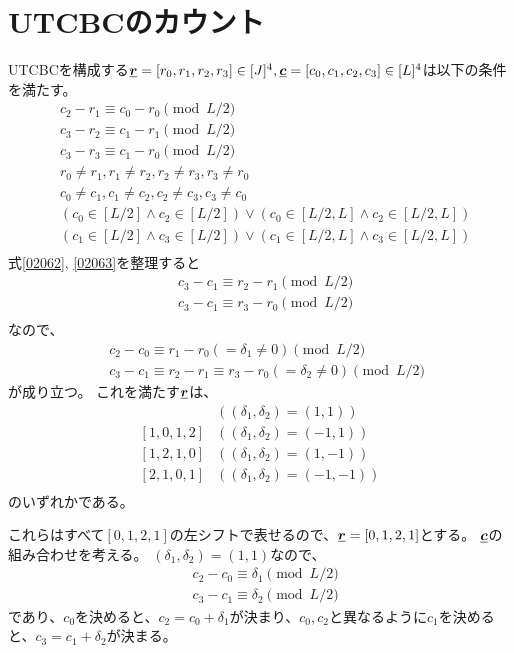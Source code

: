 \documentclass[a4paper,11pt,dvipdfmx]{jsarticle}
\theoremstyle{definition}
\begin{document}
\section{UTCBCのカウント}
UTCBCを構成する$\underline{\bm{r}} = [r_0, r_1, r_2, r_3]\in[J]^4, \underline{\bm{c}} = [c_0, c_1, c_2, c_3]\in[L]^4$は以下の条件を満たす。
\begin{align}
  &c_2 - r_1 \equiv c_0 - r_0\pmod{L/2}\label{02061}\\
  &c_3 - r_2 \equiv c_1 - r_1\pmod{L/2}\label{02062}\\
  &c_3 - r_3 \equiv c_1 - r_0\pmod{L/2}\label{02063}\\
  &r_0\neq r_1, r_1\neq r_2, r_2\neq r_3, r_3\neq r_0\label{02064}\\
  &c_0\neq c_1, c_1\neq c_2, c_2\neq c_3, c_3\neq c_0\label{02065}\\
  &(c_0\in[L/2]\land c_2\in[L/2])\lor (c_0\in[L/2, L]\land c_2\in[L/2, L])\label{02071}\\
  &(c_1\in[L/2]\land c_3\in[L/2])\lor (c_1\in[L/2, L]\land c_3\in[L/2, L])\label{02072}\\
\end{align}
式\eqref{02062}, \eqref{02063}を整理すると
\begin{align}
  &c_3 - c_1 \equiv r_2 - r_1\pmod{L/2}\\
  &c_3 - c_1 \equiv r_3 - r_0\pmod{L/2}\\
\end{align}
なので、
\begin{align}
  &c_2 - c_0 \equiv r_1 - r_0(=\delta_1\neq 0)\pmod{L/2}\\\
  &c_3 - c_1 \equiv r_2 - r_1 \equiv r_3 - r_0(=\delta_2\neq 0)\pmod{L/2}\label{02066}
\end{align}
が成り立つ。
これを満たす$\underline{\bm{r}}$は、
\begin{align}
  [0, 1, 2, 1]&((\delta_1, \delta_2) = (1, 1))\\
  [1, 0, 1, 2]&((\delta_1, \delta_2) = (-1, 1))\\
  [1, 2, 1, 0]&((\delta_1, \delta_2) = (1, -1))\\
  [2, 1, 0, 1]&((\delta_1, \delta_2) = (-1, -1))\\
\end{align}
のいずれかである。

これらはすべて$[0, 1, 2, 1]$の左シフトで表せるので、$\underline{\bm{r}} = [0,1,2,1]$とする。
$\underline{\bm{c}}$の組み合わせを考える。
$(\delta_1, \delta_2) = (1, 1)$なので、
\begin{align}
  &c_2 - c_0 \equiv \delta_1\pmod{L/2}\\
  &c_3 - c_1 \equiv \delta_2\pmod{L/2}
\end{align}
であり、$c_0$を決めると、$c_2=c_0+\delta_1$が決まり、$c_0, c_2$と異なるように$c_1$を決めると、$c_3=c_1+\delta_2$が決まる。
\end{document}

